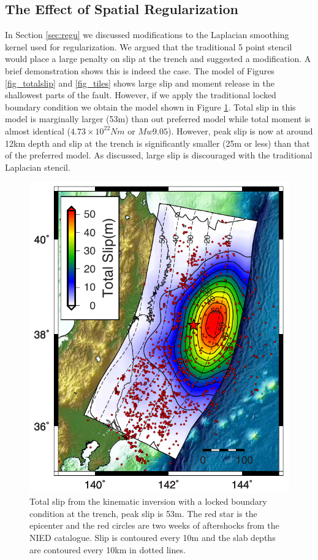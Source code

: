 \subsection{The Effect of Spatial Regularization}
In Section \ref{sec:regu} we discussed modifications to the Laplacian smoothing kernel used for regularization. We argued that the traditional 5 point stencil would place a large penalty on slip at the trench and suggested a modification. A brief demonstration shows this is indeed the case.  The model of Figures \ref{fig_totalslip} and \ref{fig_tiles} shows large slip and moment release in the shallowest parts of the fault. However, if we apply the traditional locked boundary condition we obtain the model shown in Figure \ref{fig_total_locked}. Total slip in this model is marginally larger (53m) than out preferred model while total moment is almost identical ($4.73\times10^{22}Nm$ or $Mw9.05$). However, peak slip is now at around 12km depth and slip at the trench is significantly smaller (25m or less) than that of the preferred model. As discussed, large slip is discouraged with the traditional Laplacian stencil.

\begin{figure}[!ht] 
  \centering
  \includegraphics[width=0.6\linewidth]{./figures/ch4/total_slip_locked.pdf}
    \caption[Totals lip with a locked boundary condition]{Total slip from the kinematic inversion with a locked boundary condition at the trench, peak slip is 53m. The red star is the epicenter and the red circles are two weeks of aftershocks from the NIED catalogue. Slip is contoured every 10m and the slab depths are contoured every 10km in dotted lines. }
  \label{fig_total_locked}
\end{figure}


